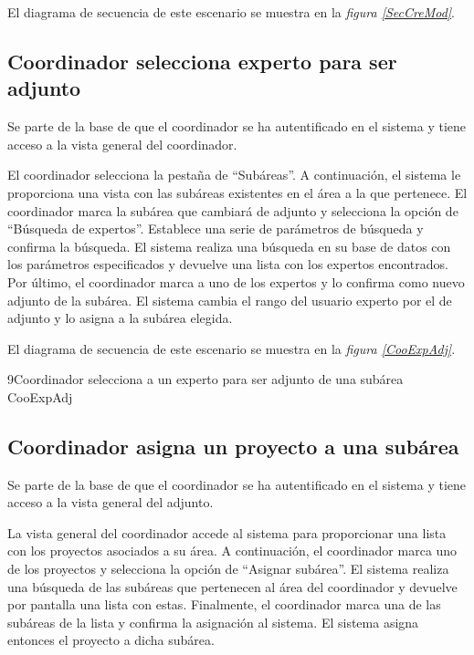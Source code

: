 \documentclass[11pt,a4paper,spanish,twoside]{book}
\begin{document}
El diagrama de secuencia de este escenario se muestra en la \emph{figura
\ref{SecCreMod}}.


\subsection{Coordinador selecciona experto para ser adjunto}
Se parte de la base de que el coordinador se ha autentificado en el sistema y
tiene acceso a la vista general del coordinador.

El coordinador selecciona la pestaña de ``Subáreas''. A continuación, el
sistema le proporciona una vista con las subáreas existentes en el área a la
que pertenece. El coordinador marca la subárea que cambiará de adjunto y
selecciona la opción de ``Búsqueda de expertos''. Establece una serie de
parámetros de búsqueda y confirma la búsqueda. El sistema realiza una búsqueda
en su base de datos con los parámetros especificados y devuelve una lista
con los expertos encontrados. Por último, el coordinador marca a uno de los
expertos y lo confirma como nuevo adjunto de la subárea. El sistema cambia
el rango del usuario experto por el de adjunto y lo asigna a la subárea
elegida.

El diagrama de secuencia de este escenario se muestra en la \emph{figura
\ref{CooExpAdj}}.

{9}{Coordinador selecciona a un experto para ser adjunto de una subárea}
{CooExpAdj}

\subsection{Coordinador asigna un proyecto a una subárea}
Se parte de la base de que el coordinador se ha autentificado en el sistema y
tiene acceso a la vista general del adjunto.

La vista general del coordinador accede al sistema para proporcionar una
lista con los proyectos asociados a su área. A continuación, el coordinador
marca uno de los proyectos y selecciona la opción de ``Asignar subárea''. El
sistema realiza una búsqueda de las subáreas que pertenecen al área del
coordinador y devuelve por pantalla una lista con estas. Finalmente, el
coordinador marca una de las subáreas de la lista y confirma la asignación
al sistema. El sistema asigna entonces el proyecto a dicha subárea.
\end{document}
